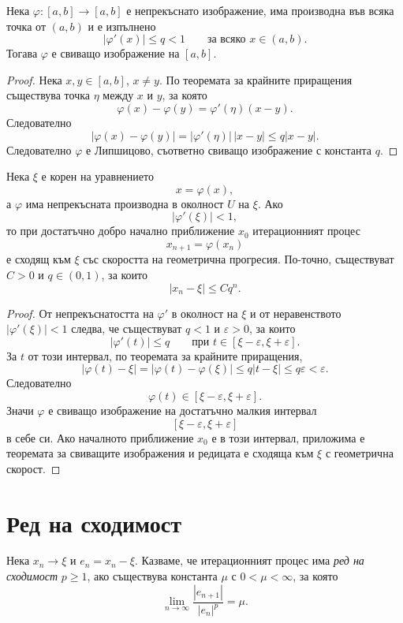 \begin{lem}
Нека $\varphi:[a,b]\to[a,b]$ е непрекъснато изображение, има производна във всяка точка от $(a,b)$ и е изпълнено
\[
|\varphi'(x)|\leq q<1
\qquad \text{за всяко }x\in(a,b).
\]
Тогава $\varphi$ е свиващо изображение на $[a,b]$.
\end{lem}

\begin{proof}
Нека $x,y\in[a,b]$, $x\neq y$. По теоремата за крайните приращения съществува точка $\eta$ между $x$ и $y$, за която
\[
\varphi(x)-\varphi(y)=\varphi'(\eta)(x-y).
\]
Следователно
\[
|\varphi(x)-\varphi(y)|
=
|\varphi'(\eta)|\,|x-y|
\leq q|x-y|.
\]
Следователно $\varphi$ е Липшицово, съответно свиващо изображение с константа $q$.
\end{proof}

\begin{cor}
Нека $\xi$ е корен на уравнението
\[
x=\varphi(x),
\]
а $\varphi$ има непрекъсната производна в околност $U$ на $\xi$. Ако
\[
|\varphi'(\xi)|<1,
\]
то при достатъчно добро начално приближение $x_0$ итерационният процес
\[
x_{n+1}=\varphi(x_n)
\]
е сходящ към $\xi$ със скоростта на геометрична прогресия. По-точно, съществуват $C>0$ и $q\in(0,1)$, за които
\[
|x_n-\xi|\leq Cq^n.
\]
\end{cor}

\begin{proof}
От непрекъснатостта на $\varphi'$ в околност на $\xi$ и от неравенството $|\varphi'(\xi)|<1$ следва, че съществуват $q<1$ и $\varepsilon>0$, за които
\[
|\varphi'(t)|\leq q
\qquad \text{при }t\in[\xi-\varepsilon,\xi+\varepsilon].
\]
За $t$ от този интервал, по теоремата за крайните приращения,
\[
|\varphi(t)-\xi|
=
|\varphi(t)-\varphi(\xi)|
\leq q|t-\xi|
\leq q\varepsilon
<
\varepsilon.
\]
Следователно
\[
\varphi(t)\in[\xi-\varepsilon,\xi+\varepsilon].
\]
Значи $\varphi$ е свиващо изображение на достатъчно малкия интервал
\[
[\xi-\varepsilon,\xi+\varepsilon]
\]
в себе си. Ако началното приближение $x_0$ е в този интервал, приложима е теоремата за свиващите изображения и редицата е сходяща към $\xi$ с геометрична скорост.
\end{proof}

\section{Ред на сходимост}\label{s:34.3}

\begin{defn}
Нека $x_n\to\xi$ и $e_n=x_n-\xi$. Казваме, че итерационният процес има \emph{ред на сходимост} $p\geq1$, ако съществува константа $\mu$ с $0<\mu<\infty$, за която
\[
\lim_{n\to\infty}\frac{|e_{n+1}|}{|e_n|^p}=\mu.
\]
\end{defn}

